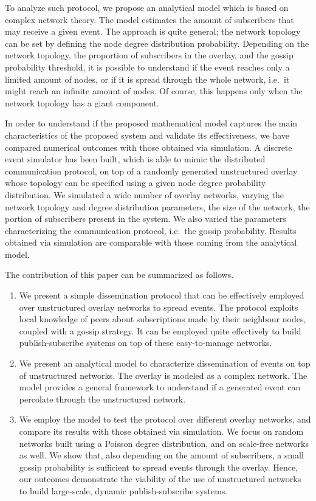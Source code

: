 \documentclass[10pt, conference, compsocconf]{IEEEtran}
\begin{document}
To analyze such protocol, we propose an analytical model which is based on complex network theory. 
The model estimates the amount of subscribers that may receive a given event. 
The approach is quite general; the network topology can be set by defining the node degree distribution probability. Depending on the network topology, the proportion of subscribers in the overlay, and the gossip probability threshold, it is possible to understand if the event reaches only a limited amount of nodes, or if it is spread through the whole network, i.e.~it might reach an infinite amount of nodes. 
Of course, this happens only when the network topology has a giant component.

In order to understand if the proposed mathematical model captures the main characteristics of the proposed system and validate its effectiveness, we have compared numerical outcomes with those obtained via simulation.
A discrete event simulator has been built, which is able to mimic the distributed communication protocol, on top of a randomly generated unstructured overlay whose topology can be specified using a given node degree probability distribution. We simulated a wide number of overlay networks, varying the network topology and degree distribution parameters, the size of the network, the portion of subscribers present in the system. We also varied the parameters characterizing the communication protocol, i.e.~the gossip probability. Results obtained via simulation are comparable with those coming from the analytical model.

The contribution of this paper can be summarized as follows.
\begin{enumerate}  
  \item We present a simple dissemination protocol that can be effectively employed over unstructured overlay networks to spread events. The protocol exploits local knowledge of peers about subscriptions made by their neighbour nodes, coupled with a gossip strategy. It can be employed quite effectively to build publish-subscribe systems on top of these easy-to-manage networks.
  \item We present an analytical model to characterize dissemination of events on top of unstructured networks. The overlay is modeled as a complex network. The model provides a general framework to understand if a generated event can percolate through the unstructured network.
  \item We employ the model to test the protocol over different overlay networks, and compare its results with those obtained via simulation. We focus on random networks built using a Poisson degree distribution, and on scale-free networks as well. We show that, also depending on the amount of subscribers, a small gossip probability is sufficient to spread events through the overlay. Hence, our outcomes demonstrate the viability of the use of unstructured networks to build large-scale, dynamic publish-subscribe systems. 
\end{enumerate}
\end{document}
